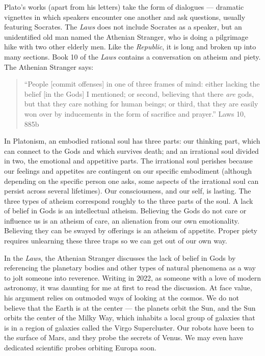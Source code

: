 \documentclass[
]{book}
\begin{document}
Plato's works (apart from his letters) take the form of dialogues --- dramatic vignettes in which speakers encounter one another and ask questions, usually featuring Socrates. The \emph{Laws} does not include Socrates as a speaker, but an unidentified old man named the Athenian Stranger, who is doing a pilgrimage hike with two other elderly men. Like the \emph{Republic}, it is long and broken up into many sections. Book 10 of the \emph{Laws} contains a conversation on atheism and piety. The Athenian Stranger says:

\begin{quote}
``People {[}commit offenses{]} in one of three frames of mind: either lacking the belief {[}in the Gods{]} I mentioned; or second, believing that there \emph{are} gods, but that they care nothing for human beings; or third, that they are easily won over by inducements in the form of sacrifice and prayer.'' Laws 10, 885b
\end{quote}

In Platonism, an embodied rational soul has three parts: our thinking part, which can connect to the Gods and which survives death; and an irrational soul divided in two, the emotional and appetitive parts. The irrational soul perishes because our feelings and appetites are contingent on our specific embodiment (although depending on the specific person one asks, some aspects of the irrational soul can persist across several lifetimes). Our consciousness, and our self, is lasting. The three types of atheism correspond roughly to the three parts of the soul. A lack of belief in Gods is an intellectual atheism. Believing the Gods do not care or influence us is an atheism of care, an alienation from our own emotionality. Believing they can be swayed by offerings is an atheism of appetite. Proper piety requires unlearning these three traps so we can get out of our own way.

In the \emph{Laws}, the Athenian Stranger discusses the lack of belief in Gods by referencing the planetary bodies and other types of natural phenomena as a way to jolt someone into reverence. Writing in 2022, as someone with a love of modern astronomy, it was daunting for me at first to read the discussion. At face value, his argument relies on outmoded ways of looking at the cosmos. We do not believe that the Earth is at the center --- the planets orbit the Sun, and the Sun orbits the center of the Milky Way, which inhabits a local group of galaxies that is in a region of galaxies called the Virgo Supercluster. Our robots have been to the surface of Mars, and they probe the secrets of Venus. We may even have dedicated scientific probes orbiting Europa soon.
\end{document}
